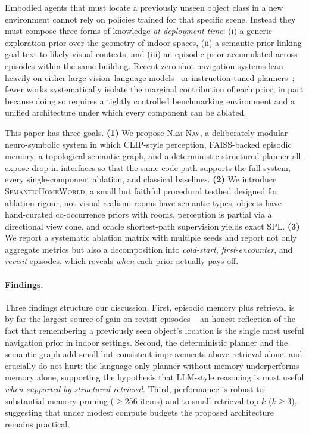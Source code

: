 \documentclass[conference,a4paper,10pt]{IEEEtran}
\begin{document}
Embodied agents that must locate a previously unseen object class in a
new environment cannot rely on policies trained for that specific scene.
Instead they must compose three forms of knowledge \emph{at deployment
time}: (i) a generic exploration prior over the geometry of indoor
spaces, (ii) a semantic prior linking goal text to likely visual
contexts, and (iii) an episodic prior accumulated across episodes within
the same building. Recent zero-shot navigation systems lean heavily on
either large vision--language models~\cite{majumdar2022zson, gadre2023cows}
or instruction-tuned planners~\cite{zhou2023esc, dorbala2023llmnav};
fewer works systematically isolate the marginal contribution of each
prior, in part because doing so requires a tightly controlled
benchmarking environment and a unified architecture under which every
component can be ablated.

This paper has three goals.
\textbf{(1)} We propose \textsc{Nem-Nav}, a deliberately modular
neuro-symbolic system in which CLIP-style perception, FAISS-backed
episodic memory, a topological semantic graph, and a deterministic
structured planner all expose drop-in interfaces so that the same code
path supports the full system, every single-component ablation, and
classical baselines.
\textbf{(2)} We introduce \textsc{SemanticHomeWorld}, a small but
faithful procedural testbed designed for ablation rigour, not visual
realism: rooms have semantic types, objects have hand-curated
co-occurrence priors with rooms, perception is partial via a directional
view cone, and oracle shortest-path supervision yields exact SPL.
\textbf{(3)} We report a systematic ablation matrix with multiple seeds
and report not only aggregate metrics but also a decomposition into
\emph{cold-start}, \emph{first-encounter}, and \emph{revisit} episodes,
which reveals \emph{when} each prior actually pays off.

\paragraph{Findings.}  Three findings structure our discussion.
First, episodic memory plus retrieval is by far the largest source of
gain on revisit episodes -- an honest reflection of the fact that
remembering a previously seen object's location is the single most
useful navigation prior in indoor settings. Second, the deterministic
planner and the semantic graph add small but consistent improvements
above retrieval alone, and crucially do not hurt: the language-only
planner without memory underperforms memory alone, supporting the
hypothesis that LLM-style reasoning is most useful \emph{when supported
by structured retrieval}. Third, performance is robust to substantial
memory pruning ($\geq$256 items) and to small retrieval top-$k$
($k\geq3$), suggesting that under modest compute budgets the proposed
architecture remains practical.
\end{document}
